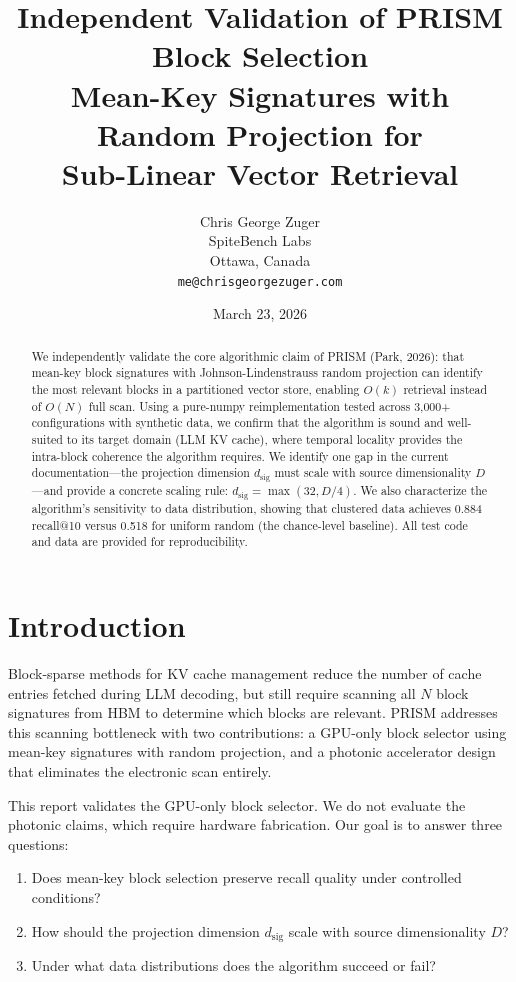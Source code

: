 \documentclass[11pt]{article}
\title{\textbf{Independent Validation of PRISM Block Selection}\\[0.3em]
\large Mean-Key Signatures with Random Projection for\\Sub-Linear Vector Retrieval}
\author{Chris George Zuger\\SpiteBench Labs\\Ottawa, Canada\\
\texttt{me@chrisgeorgezuger.com}}
\date{March 23, 2026}
\begin{document}
\maketitle

\begin{abstract}
We independently validate the core algorithmic claim of PRISM (Park, 2026): that mean-key block signatures with Johnson-Lindenstrauss random projection can identify the most relevant blocks in a partitioned vector store, enabling $O(k)$ retrieval instead of $O(N)$ full scan. Using a pure-numpy reimplementation tested across 3{,}000+ configurations with synthetic data, we confirm that the algorithm is sound and well-suited to its target domain (LLM KV cache), where temporal locality provides the intra-block coherence the algorithm requires. We identify one gap in the current documentation---the projection dimension $d_\text{sig}$ must scale with source dimensionality $D$---and provide a concrete scaling rule: $d_\text{sig} = \max(32, D/4)$. We also characterize the algorithm's sensitivity to data distribution, showing that clustered data achieves 0.884 recall@10 versus 0.518 for uniform random (the chance-level baseline). All test code and data are provided for reproducibility.
\end{abstract}

\section{Introduction}

Block-sparse methods for KV cache management reduce the number of cache entries fetched during LLM decoding, but still require scanning all $N$ block signatures from HBM to determine which blocks are relevant. PRISM addresses this scanning bottleneck with two contributions: a GPU-only block selector using mean-key signatures with random projection, and a photonic accelerator design that eliminates the electronic scan entirely.

This report validates the GPU-only block selector. We do not evaluate the photonic claims, which require hardware fabrication. Our goal is to answer three questions:

\begin{enumerate}
    \item Does mean-key block selection preserve recall quality under controlled conditions?
    \item How should the projection dimension $d_\text{sig}$ scale with source dimensionality $D$?
    \item Under what data distributions does the algorithm succeed or fail?
\end{enumerate}
\end{document}
